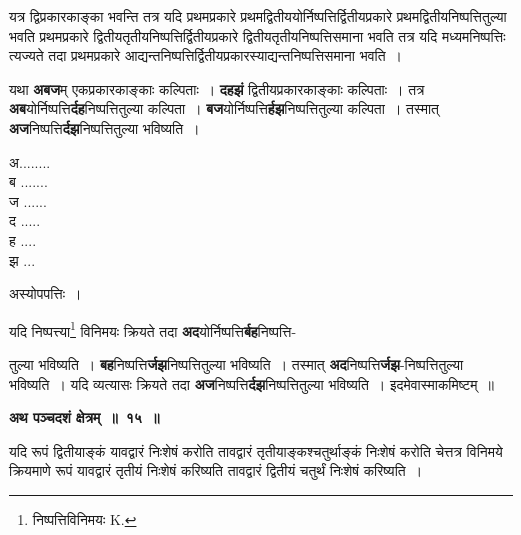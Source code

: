 \documentclass[11pt, openany]{book}
\begin{document}
{\ab यत्र द्विप्रकारकाङ्का भवन्ति तत्र यदि प्रथमप्रकारे प्रथमद्वितीययोर्निष्पत्तिर्द्वितीयप्रकारे प्रथमद्वितीयनिष्पत्तितुल्या भवति प्रथमप्रकारे द्वितीयतृतीयनिष्पत्तिर्द्वितीयप्रकारे द्वितीयतृतीयनिष्पत्तिसमाना भवति तत्र यदि मध्यमनिष्पत्तिः त्यज्यते तदा प्रथमप्रकारे आद्यन्तनिष्पत्तिर्द्वितीयप्रकारस्याद्यन्तनिष्पत्तिसमाना भवति~। }

\begin{flushleft}
\begin{minipage}[t]{0.75\textwidth}
\hspace{4mm} यथा \textbf{अबज}म् एकप्रकारकाङ्काः कल्पिताः~। \textbf{दहझं} द्वितीयप्रकारकाङ्काः कल्पिताः~। तत्र \textbf{अब}योर्निष्पत्ति\textbf{र्दह}निष्पत्तितुल्या कल्पिता~। \textbf{बज}योर्निष्पत्ति\textbf{र्हझ}निष्पत्तितुल्या कल्पिता~। तस्मात् \textbf{अज}निष्पत्ति\textbf{र्दझ}निष्पत्तितुल्या भविष्यति~।
\end{minipage} 
\hfill
\begin{minipage}[t]{0.13\textwidth}
अ........\\
ब .......\\
ज ......\\
द .....\\
ह .... \\
झ ...
\end{minipage}
\end{flushleft}
\vspace{-12mm}

\begin{center}
अस्योपपत्तिः~।
\end{center}

यदि निष्पत्त्या\renewcommand{\thefootnote}{२}\footnote{निष्पत्तिविनिमयः {\en K.}} विनिमयः क्रियते तदा \textbf{अद}योर्निष्पत्ति\textbf{र्बह}निष्पत्ति- 

\newpage
\noindent तुल्या भविष्यति~। \textbf{बह}निष्पत्ति\textbf{र्जझ}निष्पत्तितुल्या भविष्यति~। तस्मात् \textbf{अद}निष्पत्ति\textbf{र्जझ}-निष्पत्तितुल्या भविष्यति~। यदि व्यत्यासः क्रियते तदा \textbf{अज}निष्पत्ति\textbf{र्दझ}निष्पत्तितुल्या भविष्यति~। इदमेवास्माकमिष्टम्~॥ 
\vspace{2mm}

\begin{center}
\textbf{\large अथ पञ्चदशं क्षेत्रम्~॥~१५~॥}
\end{center}

{\ab यदि रूपं द्वितीयाङ्कं यावद्वारं निःशेषं करोति तावद्वारं तृतीयाङ्कश्चतुर्थाङ्कं निःशेषं करोति चेत्तत्र विनिमये क्रियमाणे रूपं यावद्वारं तृतीयं निःशेषं करिष्यति तावद्वारं द्वितीयं चतुर्थं निःशेषं करिष्यति~।} \\
\end{document}
